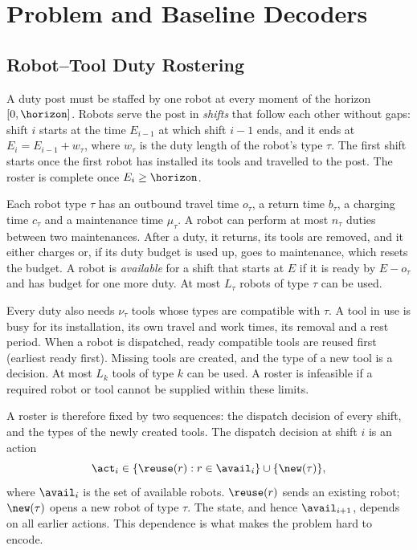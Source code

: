 \section{Problem and Baseline Decoders}
\label{sec:problem}


\subsection{Robot--Tool Duty Rostering}
\label{sec:problem:model}

A duty post must be staffed by one robot at every moment of the horizon $[0,\horizon]$.
Robots serve the post in \emph{shifts} that follow each other without gaps:
shift $i$ starts at the time $E_{i-1}$ at which shift $i-1$ ends, and it ends at $E_i = E_{i-1} + w_\tau$,
where $w_\tau$ is the duty length of the robot's type $\tau$.
The first shift starts once the first robot has installed its tools and travelled to the post.
The roster is complete once $E_i \ge \horizon$.

Each robot type $\tau$ has an outbound travel time $o_\tau$, a return time $b_\tau$, a charging time $c_\tau$ and a maintenance time $\mu_\tau$.
A robot can perform at most $n_\tau$ duties between two maintenances.
After a duty, it returns, its tools are removed, and it either charges or, if its duty budget is used up, goes to maintenance, which resets the budget.
A robot is \emph{available} for a shift that starts at $E$ if it is ready by $E - o_\tau$ and has budget for one more duty.
At most $L_\tau$ robots of type $\tau$ can be used.

Every duty also needs $\nu_\tau$ tools whose types are compatible with $\tau$.
A tool in use is busy for its installation, its own travel and work times, its removal and a rest period.
When a robot is dispatched, ready compatible tools are reused first (earliest ready first).
Missing tools are created, and the type of a new tool is a decision.
At most $L_k$ tools of type $k$ can be used.
A roster is infeasible if a required robot or tool cannot be supplied within these limits.

A roster is therefore fixed by two sequences: the dispatch decision of every shift, and the types of the newly created tools.
The dispatch decision at shift $i$ is an action
\begin{equation}
  \act_i \in \{\reuse(r) : r \in \avail_i\} \cup \{\new(\tau)\},
\end{equation}
where $\avail_i$ is the set of available robots.
$\reuse(r)$ sends an existing robot; $\new(\tau)$ opens a new robot of type $\tau$.
The state, and hence $\avail_{i+1}$, depends on all earlier actions.
This dependence is what makes the problem hard to encode.


